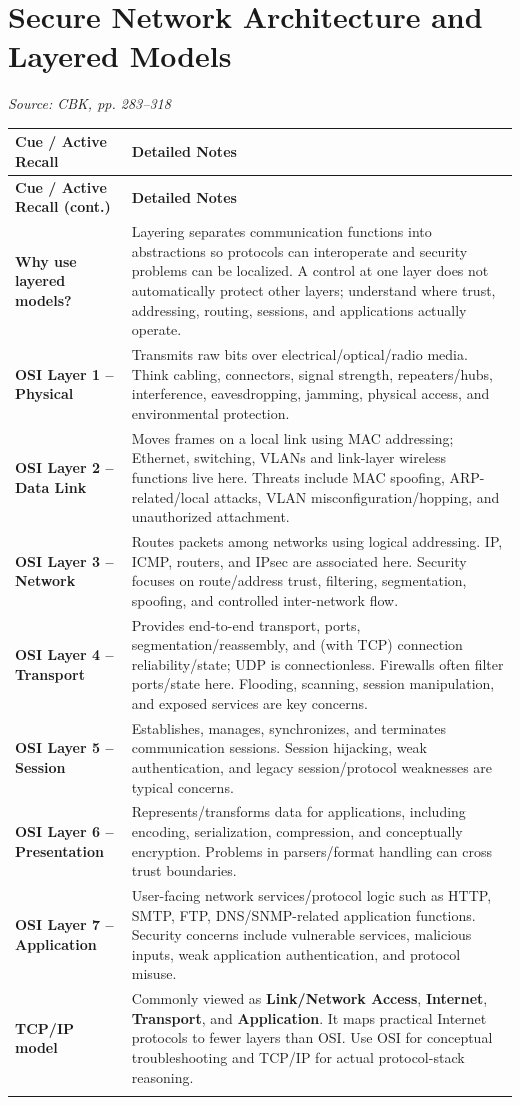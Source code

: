 \documentclass[10pt,letterpaper]{article}
\makeatletter
\newenvironment{cornell}{\rowcolors{2}{white}{notebg}\begin{longtable}{@{}>{\raggedright\arraybackslash\columncolor{cuebg}\color{navy}\bfseries}p{0.285\textwidth}>{\raggedright\arraybackslash}p{0.65\textwidth}@{}}\rowcolor{navy}\color{white}\textbf{Cue / Active Recall} & \color{white}\textbf{Detailed Notes}\\ \hline\endfirsthead\rowcolor{navy}\color{white}\textbf{Cue / Active Recall (cont.)} & \color{white}\textbf{Detailed Notes}\\ \hline\endhead}{\end{longtable}}
\newcommand{\noterow}[2]{#1 & #2\\\arrayrulecolor{line}\hline}\newcommand{\source}[1]{\par{\footnotesize\color{teal}\textit{Source: CBK, #1}}\par}
\makeatother
\begin{document}
\section{\color{navy}Secure Network Architecture and Layered Models}
\source{pp. 283--318}
\begin{cornell}
\noterow{Why use layered models?}{Layering separates communication functions into abstractions so protocols can interoperate and security problems can be localized. A control at one layer does not automatically protect other layers; understand where trust, addressing, routing, sessions, and applications actually operate.}
\noterow{OSI Layer 1 -- Physical}{Transmits raw bits over electrical/optical/radio media. Think cabling, connectors, signal strength, repeaters/hubs, interference, eavesdropping, jamming, physical access, and environmental protection.}
\noterow{OSI Layer 2 -- Data Link}{Moves frames on a local link using MAC addressing; Ethernet, switching, VLANs and link-layer wireless functions live here. Threats include MAC spoofing, ARP-related/local attacks, VLAN misconfiguration/hopping, and unauthorized attachment.}
\noterow{OSI Layer 3 -- Network}{Routes packets among networks using logical addressing. IP, ICMP, routers, and IPsec are associated here. Security focuses on route/address trust, filtering, segmentation, spoofing, and controlled inter-network flow.}
\noterow{OSI Layer 4 -- Transport}{Provides end-to-end transport, ports, segmentation/reassembly, and (with TCP) connection reliability/state; UDP is connectionless. Firewalls often filter ports/state here. Flooding, scanning, session manipulation, and exposed services are key concerns.}
\noterow{OSI Layer 5 -- Session}{Establishes, manages, synchronizes, and terminates communication sessions. Session hijacking, weak authentication, and legacy session/protocol weaknesses are typical concerns.}
\noterow{OSI Layer 6 -- Presentation}{Represents/transforms data for applications, including encoding, serialization, compression, and conceptually encryption. Problems in parsers/format handling can cross trust boundaries.}
\noterow{OSI Layer 7 -- Application}{User-facing network services/protocol logic such as HTTP, SMTP, FTP, DNS/SNMP-related application functions. Security concerns include vulnerable services, malicious inputs, weak application authentication, and protocol misuse.}
\noterow{TCP/IP model}{Commonly viewed as \textbf{Link/Network Access}, \textbf{Internet}, \textbf{Transport}, and \textbf{Application}. It maps practical Internet protocols to fewer layers than OSI. Use OSI for conceptual troubleshooting and TCP/IP for actual protocol-stack reasoning.}

\end{cornell}
\end{document}
